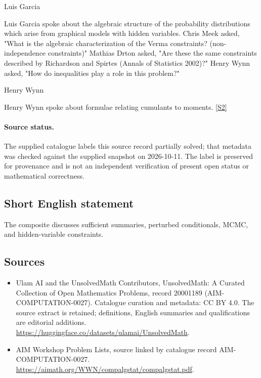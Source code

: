 \documentclass[11pt]{article}
\newcommand{\sref}[2]{\hyperlink{source:#1:#2}{[S#2]}}
\begin{document}
Luis Garcia

Luis Garcia spoke about the algebraic structure of the probability distributions which arise from graphical models with hidden variables. Chris Meek asked, "What is the algebraic characterization of the Verma constraints? (non-independence constraints)" Mathias Drton asked, "Are these the same constraints described by Richardson and Spirtes (Annals of Statistics 2002)?" Henry Wynn asked, "How do inequalities play a role in this problem?"

Henry Wynn

Henry Wynn spoke about formulae relating cumulants to moments. \sref{20001189}{2}
\paragraph{Source status.}
The supplied catalogue labels this source record partially solved; that metadata was checked against the supplied snapshot on 2026-10-11. The label is preserved for provenance and is not an independent verification of present open status or mathematical correctness.
\subsection{Short English statement}
The composite discusses sufficient summaries, perturbed conditionals, MCMC, and hidden-variable constraints.
\subsection{Sources}
\begin{itemize}
\item[\hypertarget{source:20001189:1}{S1}] Ulam AI and the UnsolvedMath Contributors, UnsolvedMath: A Curated Collection of Open Mathematics Problems, record 20001189 (AIM-COMPUTATION-0027). Catalogue curation and metadata: CC BY 4.0. The source extract is retained; definitions, English summaries and qualifications are editorial additions.
\url{https://huggingface.co/datasets/ulamai/UnsolvedMath}.
\item[\hypertarget{source:20001189:2}{S2}] AIM Workshop Problem Lists, source linked by catalogue record AIM-COMPUTATION-0027.
\url{https://aimath.org/WWN/compalgstat/compalgstat.pdf}.
\end{itemize}
\end{document}
